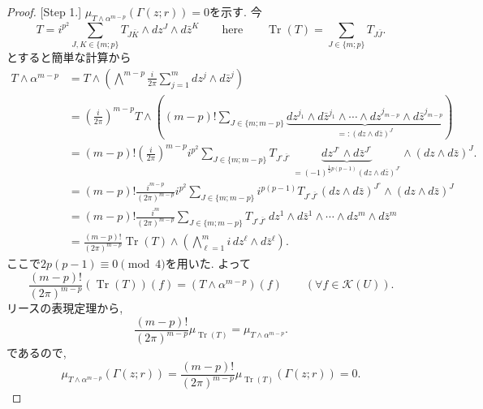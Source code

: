 \begin{proof}

[Step 1.] $\mu_{T\wedge\alpha^{m-p}}(\Gamma(z;r))=0$を示す. 
今
\begin{equation*}
T
=
i^{p^2}
\sum_{J,K\in\{m;p\}}
T_{J\bar K}\wedge dz^J\wedge d\bar z^K
\qquad
\text{here}\qquad
\operatorname{Tr}(T)
=
\sum_{J\in\{m;p\}}T_{J\bar J}.
\end{equation*}
とすると簡単な計算から
\begin{align*}
T\wedge\alpha^{m-p}
&=
T\wedge
\left(
\bigwedge^{m-p}
\frac{i}{2\pi}
\sum_{j=1}^m dz^j\wedge d\bar z^j
\right)\\
&=
\left(\frac{i}{2\pi}\right)^{m-p}
T\wedge
\left(
(m-p)!
\sum_{J\in\{m;m-p\}}
\underbrace{
dz^{j_1}\wedge d\bar z^{j_1}
\wedge\cdots\wedge
dz^{j_{m-p}}\wedge d\bar z^{j_{m-p}}
}_{=:(dz\wedge d\bar z)^J}
\right)\\
&=
(m-p)!
\left(\frac{i}{2\pi}\right)^{m-p}
i^{p^2}
\sum_{J\in\{m;m-p\}}
T_{J^\circ\overline{J^\circ}}\,
\underbrace{dz^{J^\circ}\wedge d\bar z^{J^\circ}}_{=
(-1)^{\frac12p(p-1)}(dz\wedge d\bar z)^{J^\circ}}
\wedge(dz\wedge d\bar z)^J.
\\
&=
(m-p)!
\frac{i^{m-p}}{(2\pi)^{m-p}}
i^{p^2}
\sum_{J\in\{m;m-p\}}
i^{p(p-1)}
T_{J^\circ\overline{J^\circ}}
(dz\wedge d\bar z)^{J^\circ}
\wedge(dz\wedge d\bar z)^J\\
&=
(m-p)!
\frac{i^m}{(2\pi)^{m-p}}
\sum_{J\in\{m;m-p\}}
T_{J^\circ\overline{J^\circ}}\,
dz^1\wedge d\bar z^1\wedge\cdots\wedge dz^m\wedge d\bar z^m\\
&=
\frac{(m-p)!}{(2\pi)^{m-p}}
\operatorname{Tr}(T)\wedge
\left(
\bigwedge_{\ell=1}^m
i\,dz^\ell\wedge d\bar z^\ell
\right).
\end{align*}
ここで$2p(p-1)\equiv0\pmod 4$を用いた. よって
\begin{equation*}
\frac{(m-p)!}{(2\pi)^{m-p}}
(\operatorname{Tr}(T))(f)
=
(T\wedge\alpha^{m-p})(f)
\qquad
(\forall f\in\mathcal{K}(U)).
\end{equation*}
リースの表現定理から, 
\begin{equation*}
\frac{(m-p)!}{(2\pi)^{m-p}}
\mu_{\operatorname{Tr}(T)}
=
\mu_{T\wedge\alpha^{m-p}}.
\end{equation*}
であるので, 
\begin{equation*}
\mu_{T\wedge\alpha^{m-p}}(\Gamma(z;r))
=
\frac{(m-p)!}{(2\pi)^{m-p}}
\mu_{\operatorname{Tr}(T)}(\Gamma(z;r))
=
0.
\end{equation*}


\end{proof}
